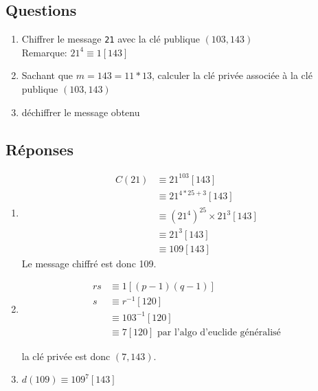 \subsection{Questions}
\begin{enumerate}
\item Chiffrer le message \verb?21? avec la clé publique $(103, 143)$\\
Remarque: $21^4 \equiv 1[143]$
\item Sachant que $m = 143 = 11 * 13$, calculer la clé privée associée à la 
clé publique $(103, 143)$
\item déchiffrer le message obtenu
\end{enumerate}

\subsection{Réponses}
\begin{enumerate}
\item
\begin{align*}
C(21) &\equiv 21^{103}[143]\\
      &\equiv 21^{4*25+3}[143]\\
      &\equiv (21^4)^{25} \times 21^3 [143]\\
      &\equiv 21^3[143]\\
      &\equiv 109[143]
\end{align*}
Le message chiffré est donc 109.
\item 
\begin{align*}
rs &\equiv 1[(p-1)(q-1)]\\
s &\equiv r^{-1}[120]\\
  &\equiv 103^{-1}[120]\\
  &\equiv 7[120] \text{ par l'algo d'euclide généralisé}
\end{align*}

la clé privée est donc $(7,143)$.

\item $d(109) \equiv 109^7[143]$
\end{enumerate}
